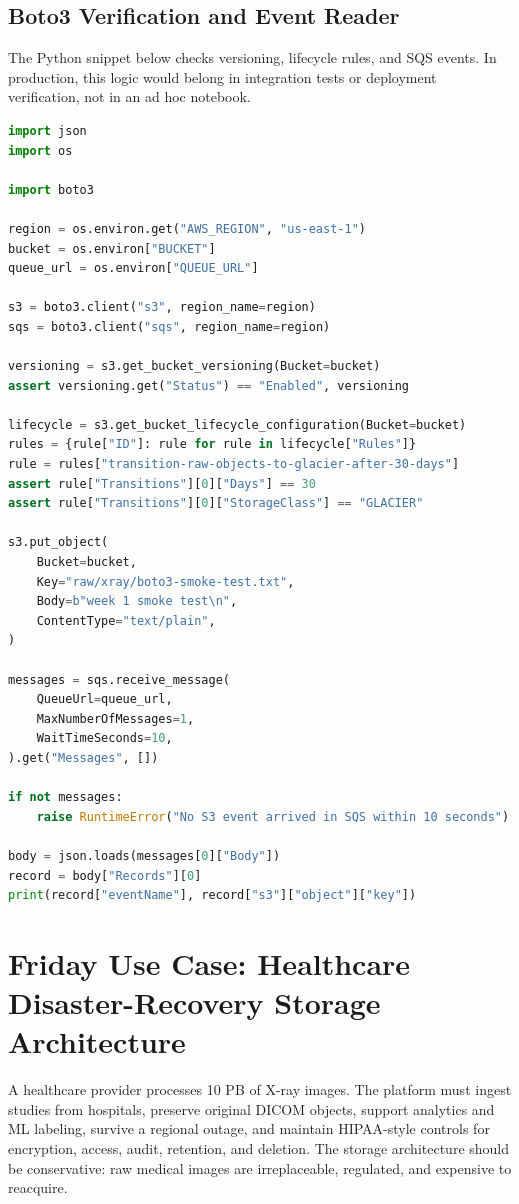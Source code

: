 \subsection{Boto3 Verification and Event Reader}
The Python snippet below checks versioning, lifecycle rules, and SQS events. In production, this logic would belong in integration tests or deployment verification, not in an ad hoc notebook.

\begin{lstlisting}[language=Python,caption={Boto3 verification for S3 lifecycle and SQS event delivery.},label={lst:boto3-verify}]
import json
import os

import boto3

region = os.environ.get("AWS_REGION", "us-east-1")
bucket = os.environ["BUCKET"]
queue_url = os.environ["QUEUE_URL"]

s3 = boto3.client("s3", region_name=region)
sqs = boto3.client("sqs", region_name=region)

versioning = s3.get_bucket_versioning(Bucket=bucket)
assert versioning.get("Status") == "Enabled", versioning

lifecycle = s3.get_bucket_lifecycle_configuration(Bucket=bucket)
rules = {rule["ID"]: rule for rule in lifecycle["Rules"]}
rule = rules["transition-raw-objects-to-glacier-after-30-days"]
assert rule["Transitions"][0]["Days"] == 30
assert rule["Transitions"][0]["StorageClass"] == "GLACIER"

s3.put_object(
    Bucket=bucket,
    Key="raw/xray/boto3-smoke-test.txt",
    Body=b"week 1 smoke test\n",
    ContentType="text/plain",
)

messages = sqs.receive_message(
    QueueUrl=queue_url,
    MaxNumberOfMessages=1,
    WaitTimeSeconds=10,
).get("Messages", [])

if not messages:
    raise RuntimeError("No S3 event arrived in SQS within 10 seconds")

body = json.loads(messages[0]["Body"])
record = body["Records"][0]
print(record["eventName"], record["s3"]["object"]["key"])
\end{lstlisting}

\section{Friday Use Case: Healthcare Disaster-Recovery Storage Architecture}
A healthcare provider processes 10 PB of X-ray images. The platform must ingest studies from hospitals, preserve original DICOM objects, support analytics and ML labeling, survive a regional outage, and maintain HIPAA-style controls for encryption, access, audit, retention, and deletion. The storage architecture should be conservative: raw medical images are irreplaceable, regulated, and expensive to reacquire.

